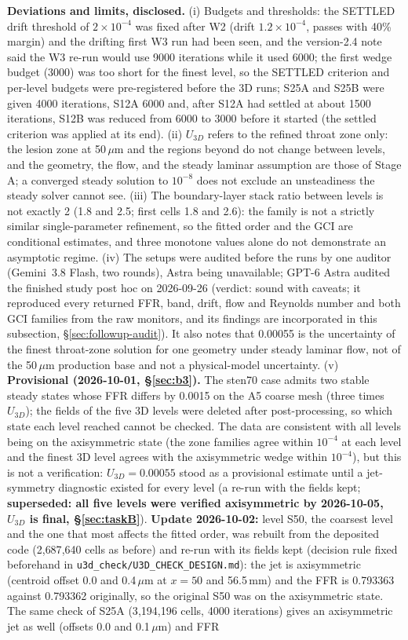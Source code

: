 \documentclass[11pt]{article}
\begin{document}
\textbf{Deviations and limits, disclosed.} (i) Budgets and thresholds: the SETTLED drift threshold of $2\times10^{-4}$ was fixed after W2 (drift $1.2\times10^{-4}$, passes with 40\% margin) and the drifting first W3 run had been seen, and the version-2.4 note said the W3 re-run would use 9000 iterations while it used 6000; the first wedge budget (3000) was too short for the finest level, so the SETTLED criterion and per-level budgets were pre-registered before the 3D runs; S25A and S25B were given 4000 iterations, S12A 6000 and, after S12A had settled at about 1500 iterations, S12B was reduced from 6000 to 3000 before it started (the settled criterion was applied at its end). (ii) $U_{3D}$ refers to the refined throat zone only: the lesion zone at 50\,$\mu$m and the regions beyond do not change between levels, and the geometry, the flow, and the steady laminar assumption are those of Stage A; a converged steady solution to $10^{-8}$ does not exclude an unsteadiness the steady solver cannot see. (iii) The boundary-layer stack ratio between levels is not exactly 2 (1.8 and 2.5; first cells 1.8 and 2.6): the family is not a strictly similar single-parameter refinement, so the fitted order and the GCI are conditional estimates, and three monotone values alone do not demonstrate an asymptotic regime. (iv) The setups were audited before the runs by one auditor (Gemini~3.8 Flash, two rounds), Astra being unavailable; GPT-6 Astra audited the finished study post hoc on 2026-09-26 (verdict: sound with caveats; it reproduced every returned FFR, band, drift, flow and Reynolds number and both GCI families from the raw monitors, and its findings are incorporated in this subsection, \S\ref{sec:followup-audit}). It also notes that 0.00055 is the uncertainty of the finest throat-zone solution for one geometry under steady laminar flow, not of the 50\,$\mu$m production base and not a physical-model uncertainty. (v) \textbf{Provisional (2026-10-01, \S\ref{sec:b3}).} The sten70 case admits two stable steady states whose FFR differs by 0.0015 on the A5 coarse mesh (three times $U_{3D}$); the fields of the five 3D levels were deleted after post-processing, so which state each level reached cannot be checked. The data are consistent with all levels being on the axisymmetric state (the zone families agree within $10^{-4}$ at each level and the finest 3D level agrees with the axisymmetric wedge within $10^{-4}$), but this is not a verification: $U_{3D}=0.00055$ stood as a provisional estimate until a jet-symmetry diagnostic existed for every level (a re-run with the fields kept; \textbf{superseded: all five levels were verified axisymmetric by 2026-10-05, $U_{3D}$ is final, \S\ref{sec:taskB}}). \textbf{Update 2026-10-02:} level S50, the coarsest level and the one that most affects the fitted order, was rebuilt from the deposited code (2{,}687{,}640 cells as before) and re-run with its fields kept (decision rule fixed beforehand in \texttt{u3d\_check/U3D\_CHECK\_DESIGN.md}): the jet is axisymmetric (centroid offset 0.0 and 0.4\,$\mu$m at $x=50$ and 56.5\,mm) and the FFR is 0.793363 against 0.793362 originally, so the original S50 was on the axisymmetric state. The same check of S25A (3{,}194{,}196 cells, 4000 iterations) gives an axisymmetric jet as well (offsets 0.0 and 0.1\,$\mu$m) and FFR 
\end{document}
